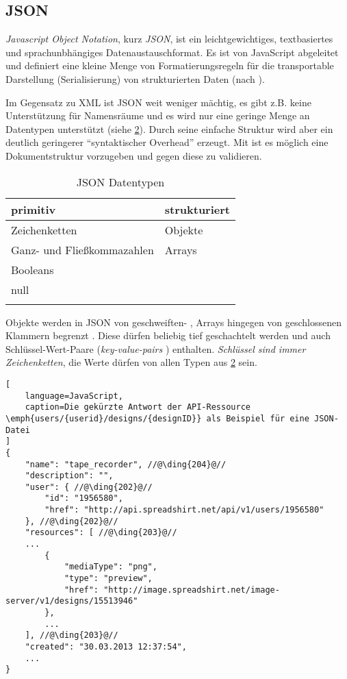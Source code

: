 \subsection{JSON}
\label{sec:json}

\begin{thesisDefinition}[JSON]
\emph{Javascript Object Notation}, kurz \emph{JSON}, ist ein leichtgewichtiges, textbasiertes und sprachunbhängiges Datenaustauschformat. Es ist von JavaScript abgeleitet und definiert eine kleine Menge von Formatierungsregeln für die transportable Darstellung (Serialisierung) von strukturierten Daten (nach \cite{JSONRFC}).
\end{thesisDefinition}

Im Gegensatz zu XML ist JSON weit weniger mächtig, es gibt z.B. keine Unterstützung für Namensräume und es wird nur eine geringe Menge an Datentypen unterstützt (siehe \cref{tab:jsonDatatypes}). 
Durch seine einfache Struktur wird aber ein deutlich geringerer \enquote{syntaktischer Overhead} erzeugt.
Mit  ist es möglich eine Dokumentstruktur vorzugeben und gegen diese zu validieren. 

\begin{table}[tb]
    \begin{longtable}[c]{l l}
        \toprule
        \rowcolor{lightgray}
        \textbf{primitiv}   & \textbf{strukturiert}\\
        \midrule
        Zeichenketten       & Objekte\\
        Ganz- und 
        Fließkommazahlen    & Arrays\\
        Booleans            & \\
        null                & \\
        \bottomrule
        \caption{JSON Datentypen}
        \label{tab:jsonDatatypes}
    \end{longtable}
\end{table}

Objekte werden in JSON von geschweiften- , Arrays hingegen von geschlossenen Klammern begrenzt . Diese dürfen beliebig tief geschachtelt werden und auch Schlüssel-Wert-Paare (\emph{key-value-pairs} ) enthalten. \emph{Schlüssel sind immer Zeichenketten}, die Werte dürfen von allen Typen aus \cref{tab:jsonDatatypes} sein.
%
%
\begin{lstlisting}[
    language=JavaScript,
    caption=Die gekürzte Antwort der API-Ressource \emph{users/{userid}/designs/{designID}} als Beispiel für eine JSON-Datei
]
{
    "name": "tape_recorder", //@\ding{204}@//
    "description": "",
    "user": { //@\ding{202}@//
        "id": "1956580",
        "href": "http://api.spreadshirt.net/api/v1/users/1956580"
    }, //@\ding{202}@//
    "resources": [ //@\ding{203}@//
    ...
        {
            "mediaType": "png",
            "type": "preview",
            "href": "http://image.spreadshirt.net/image-server/v1/designs/15513946"
        }, 
        ...
    ], //@\ding{203}@//
    "created": "30.03.2013 12:37:54",
    ...
}
\end{lstlisting}    
